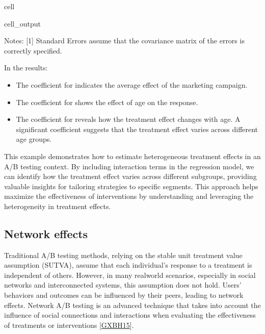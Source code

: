 \documentclass[letterpaper,10pt,english]{jupyterBook}
\begin{document}
\begin{sphinxuseclass}{cell}
\begin{sphinxVerbatimOutput}
\begin{sphinxuseclass}{cell_output}
\begin{sphinxVerbatim}[commandchars=\\\{\}]
Notes:
[1] Standard Errors assume that the covariance matrix of the errors is correctly specified.
\end{sphinxVerbatim}

\noindent{}

\end{sphinxuseclass}\end{sphinxVerbatimOutput}

\end{sphinxuseclass}
\sphinxAtStartPar
In the results:
\begin{itemize}
\item {} 
\sphinxAtStartPar
The coefficient for  indicates the average effect of the marketing campaign.

\item {} 
\sphinxAtStartPar
The coefficient for  shows the effect of age on the response.

\item {} 
\sphinxAtStartPar
The coefficient for  reveals how the treatment effect changes with age. A significant coefficient suggests that the treatment effect varies across different age groups.

\end{itemize}

\sphinxAtStartPar
This example demonstrates how to estimate heterogeneous treatment effects in an A/B testing context. By including interaction terms in the regression model, we can identify how the treatment effect varies across different subgroups, providing valuable insights for tailoring strategies to specific segments. This approach helps maximize the effectiveness of interventions by understanding and leveraging the heterogeneity in treatment effects.


\subsection{Network effects}
\label{\detokenize{notebooks/AB_testing:network-effects}}
\sphinxAtStartPar
Traditional A/B testing methods, relying on the stable unit treatment value assumption (SUTVA), assume that each individual’s response to a treatment is independent of others. However, in many real\sphinxhyphen{}world scenarios, especially in social networks and interconnected systems, this assumption does not hold. Users’ behaviors and outcomes can be influenced by their peers, leading to network effects. Network A/B testing is an advanced technique that takes into account the influence of social connections and interactions when evaluating the effectiveness of treatments or interventions {[}\hyperlink{cite.bibliography:id19}{GXBH15}{]}.
\end{document}
